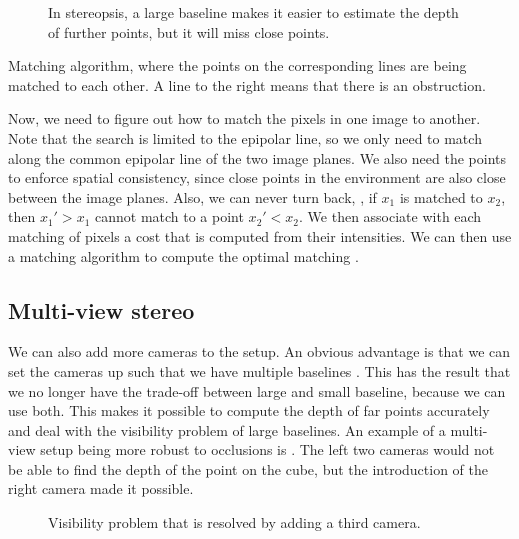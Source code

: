 \begin{figure}[t]
    \centering
    \caption{In stereopsis, a large baseline makes it easier to estimate the
        depth of further points, but it will miss close points.}
    \label{fig:stereo-baseline}
\end{figure}

\begin{marginfigure}
    \centering
    \caption{Matching algorithm, where the points on the corresponding lines are
        being matched to each other. A line to the right means that there is an
        obstruction.}
    \label{fig:matching-algorithm}
\end{marginfigure}

Now, we need to figure out how to match the pixels in one image to another.
Note that the search is limited to the epipolar line, so we only need to match
along the common epipolar line of the two image planes. We also need the points
to enforce spatial consistency, since close points in the environment are also
close between the image planes. Also, we can never turn back, \ie, if $x_1$ is
matched to $x_2$, then $x_1' > x_1$ cannot match to a point $x_2' < x_2$. We
then associate with each matching of pixels a cost that is computed from their
intensities. We can then use a matching algorithm to compute the optimal
matching \citep{baker1981depth}.

\subsection{Multi-view stereo}

We can also add more cameras to the setup. An obvious advantage is that we can
set the cameras up such that we have multiple baselines
\citep{okutomi1993multiple}. This has the result that we no longer have the
trade-off between large and small baseline, because we can use both. This makes
it possible to compute the depth of far points accurately and deal with the
visibility problem of large baselines. An example of a multi-view setup being
more robust to occlusions is . The left two
cameras would not be able to find the depth of the point on the cube, but the
introduction of the right camera made it possible.

\begin{figure}
    \centering
    \caption{Visibility problem that is resolved by adding a third camera.}
    \label{fig:visibility-problem}
\end{figure}

